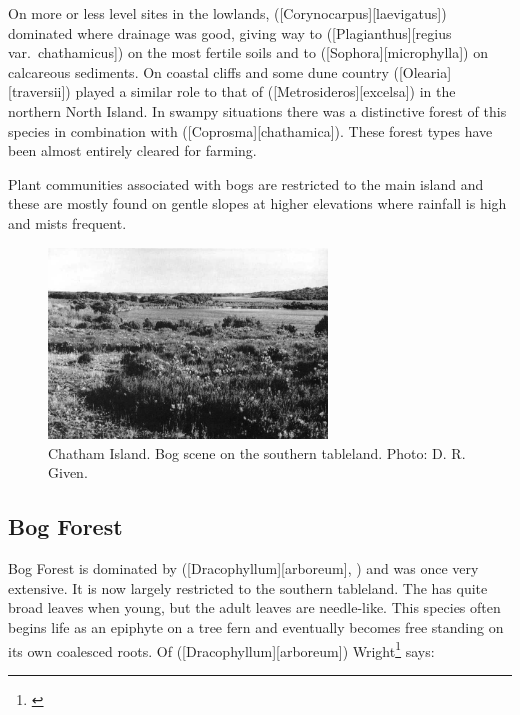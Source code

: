 On more or less level sites in the lowlands,  ([Corynocarpus][laevigatus]) dominated where drainage was good, giving way to  ([Plagianthus][regius var.\ chathamicus]) on the most fertile soils and to  ([Sophora][microphylla]) on calcareous sediments.
On coastal cliffs and some dune country  ([Olearia][traversii]) played a similar role to that of  ([Metrosideros][excelsa]) in the northern North Island.
In swampy situations there was a distinctive forest of this species in combination with  ([Coprosma][chathamica]).
These forest types have been almost entirely cleared for farming.

Plant communities associated with bogs are restricted to the main island and these are mostly found on gentle slopes at higher elevations where rainfall is high and mists frequent.

\begin{figure}
	\includegraphics[width=0.66\textwidth]{graphics/figure119chatham-island-bog.jpg}
	\centering
	\caption[Chatham Island bog scene]{Chatham Island.
	Bog scene on the southern tableland.
	Photo: D. R. Given.}%
	\label{fig:119chatham-island-bog}
\end{figure}

\subsection{Bog Forest}

Bog Forest is dominated by  ([Dracophyllum][arboreum], ) and was once very extensive.
It is now largely restricted to the southern tableland.
The  has quite broad leaves when young, but the adult leaves are needle-like.
This species often begins life as an epiphyte on a tree fern and eventually becomes free standing on its own coalesced roots.
Of  ([Dracophyllum][arboreum]) Wright\footnote{\cite{wright1959soils}} says:

